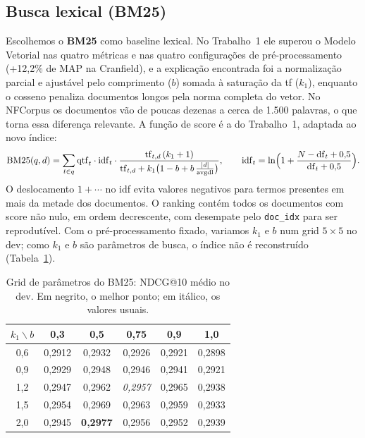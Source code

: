 \documentclass[10pt,a4paper]{article}
\begin{document}
\subsection{Busca lexical (BM25)}

Escolhemos o \textbf{BM25} como baseline lexical. No Trabalho~1 ele superou o Modelo Vetorial nas quatro métricas e nas quatro configurações de pré-processamento (+12,2\% de MAP na Cranfield), e a explicação encontrada foi a normalização parcial e ajustável pelo comprimento ($b$) somada à saturação da tf ($k_1$), enquanto o cosseno penaliza documentos longos pela norma completa do vetor. No NFCorpus os documentos vão de poucas dezenas a cerca de 1.500 palavras, o que torna essa diferença relevante. A função de score é a do Trabalho~1, adaptada ao novo índice:
\[
\mathrm{BM25}(q,d) = \sum_{t \in q} \mathrm{qtf}_t \cdot \mathrm{idf}_t \cdot
\frac{\mathrm{tf}_{t,d}\,(k_1+1)}{\mathrm{tf}_{t,d} + k_1\bigl(1 - b + b\,\frac{|d|}{\mathrm{avgdl}}\bigr)},
\qquad
\mathrm{idf}_t = \ln\Bigl(1 + \frac{N - \mathrm{df}_t + 0{,}5}{\mathrm{df}_t + 0{,}5}\Bigr).
\]
O deslocamento $1+\cdots$ no idf evita valores negativos para termos presentes em mais da metade dos documentos. O ranking contém todos os documentos com score não nulo, em ordem decrescente, com desempate pelo \texttt{doc\_idx} para ser reprodutível. Com o pré-processamento fixado, variamos $k_1$ e $b$ num grid $5 \times 5$ no dev; como $k_1$ e $b$ são parâmetros de busca, o índice não é reconstruído (Tabela~\ref{tab:grid}).

\begin{table}[!htb]
\centering\small
\caption{Grid de parâmetros do BM25: NDCG@10 médio no dev. Em negrito, o melhor ponto; em itálico, os valores usuais.}
\label{tab:grid}
\begin{tabular}{@{}c ccccc@{}}
\toprule
$k_1 \backslash b$ & 0,3 & 0,5 & 0,75 & 0,9 & 1,0 \\
\midrule
0,6 & 0,2912 & 0,2932 & 0,2926 & 0,2921 & 0,2898 \\
0,9 & 0,2929 & 0,2948 & 0,2946 & 0,2941 & 0,2921 \\
1,2 & 0,2947 & 0,2962 & \emph{0,2957} & 0,2965 & 0,2938 \\
1,5 & 0,2954 & 0,2969 & 0,2963 & 0,2959 & 0,2933 \\
2,0 & 0,2945 & \textbf{0,2977} & 0,2956 & 0,2952 & 0,2939 \\
\bottomrule
\end{tabular}
\end{table}
\end{document}
